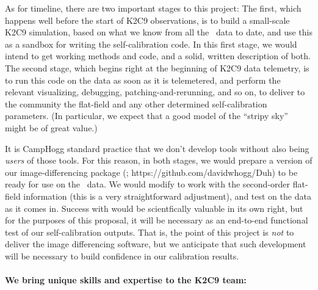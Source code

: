 \documentclass[12pt,preprint]{aastex}
\begin{document}
As for timeline, there are two important stages to this project:
The first, which happens well before the start of K2C9 observations,
is to build a small-scale K2C9 simulation, based on what we know from
all the \ktwo\ data to date, and use this as a sandbox for writing the
self-calibration code.
In this first stage, we would intend to get working methods and code,
and a solid, written description of both.
The second stage, which begins right at the beginning of K2C9 data
telemetry, is to run this code on the data as soon as it is
telemetered, and perform the relevant visualizing, debugging,
patching-and-rerunning, and so on, to deliver to the community the
flat-field and any other determined self-calibration parameters.
(In particular, we expect that a good model of the ``stripy sky''
might be of great value.)

It is CampHogg standard practice that we don't develop tools without
also being \emph{users} of those tools.
For this reason, in both stages, we would prepare a version of our
image-differencing package (; https://github.com/davidwhogg/Duh)
to be ready for use on the \ktwo\ data.
We would modify  to work with the second-order flat-field
information (this is a very straightforward adjustment), and test
 on the data as it comes in.
Success with  would be scientfically valuable in its own
right, but for the purposes of this proposal, it will be necessary as
an end-to-end functional test of our self-calibration outputs.
That is, the point of this project is \emph{not} to deliver the image
differencing software, but we anticipate that such development will be
necessary to build confidence in our calibration results.

\paragraph{We bring unique skills and expertise to the K2C9 team:}
\end{document}
